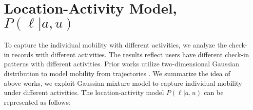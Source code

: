 

%
%





\section{Location-Activity Model, $P(\ell | a, u)$}
\label{sec:4-5}

To capture the individual mobility with different activities, we analyze the check-in records with different activities.  The results reflect users have different check-in patterns with different activities. Prior works utilize two-dimensional Gaussian distribution to model mobility from trajectories \cite{06_Nature_Brockmann}\cite{08_Nature_Gonzalez}\cite{11_KDD_Cho}\cite{13_CIKM_Gao}\cite{14_KDD_Lichman}. We summarize the idea of above works, we exploit Gaussian mixture model to capture individual mobility under different activities. The location-activity model $P(\ell | a, u)$ can be represented as follows:

